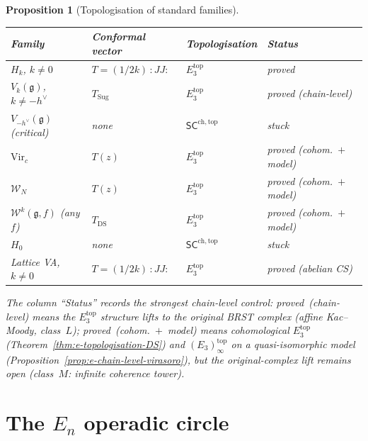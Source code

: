 \documentclass[11pt,reqno]{amsart}
\newtheorem{proposition}[theorem]{Proposition}
\theoremstyle{definition}
\theoremstyle{remark}
\providecommand{\cW}{\mathcal{W}}
\providecommand{\fg}{\mathfrak{g}}
\providecommand{\Ethree}{E_3}
\providecommand{\En}{E_n}
\providecommand{\SCchtop}{\ensuremath{\mathsf{SC}^{\mathrm{ch,top}}}}
\begin{document}
\begin{proposition}[Topologisation of standard families]
\label{prop:e-topologisation-status}
\begin{center}
\renewcommand{\arraystretch}{1.15}
\begin{tabular}{llll}
\textbf{Family} & \textbf{Conformal vector} &
 \textbf{Topologisation} & \textbf{Status} \\
\hline
$H_k$, $k \neq 0$ & $T = (1/2k)\,{:}JJ{:}$ &
 $\Ethree^{\mathrm{top}}$ & proved \\
$V_k(\fg)$, $k \neq -h^\vee$ &
 $T_{\mathrm{Sug}}$ & $\Ethree^{\mathrm{top}}$ &
 proved (chain-level) \\
$V_{-h^\vee}(\fg)$ (critical) & none &
 $\SCchtop$ & stuck \\
$\mathrm{Vir}_c$ & $T(z)$ &
 $\Ethree^{\mathrm{top}}$ &
 proved (cohom.\ $+$ model) \\
$\cW_N$ & $T(z)$ &
 $\Ethree^{\mathrm{top}}$ &
 proved (cohom.\ $+$ model) \\
$\cW^k(\fg, f)$ (any $f$) & $T_{\mathrm{DS}}$ &
 $\Ethree^{\mathrm{top}}$ &
 proved (cohom.\ $+$ model) \\
$H_0$ & none & $\SCchtop$ & stuck \\
Lattice VA, $k \neq 0$ & $T = (1/2k)\,{:}JJ{:}$ &
 $\Ethree^{\mathrm{top}}$ & proved (abelian CS)
\end{tabular}
\end{center}
The column ``Status'' records the strongest chain-level
control:
\emph{proved~\textup{(}chain-level\textup{)}} means the
$\Ethree^{\mathrm{top}}$ structure lifts to the original
BRST complex
\textup{(}affine Kac--Moody, class~$L$\textup{)};
\emph{proved~\textup{(}cohom.~$+$~model\textup{)}} means
cohomological $\Ethree^{\mathrm{top}}$
\textup{(}Theorem~\ref{thm:e-topologisation-DS}\textup{)}
and $(\Ethree)_\infty^{\mathrm{top}}$ on a
quasi-isomorphic model
\textup{(}Proposition~\ref{prop:e-chain-level-virasoro}\textup{)},
but the original-complex lift remains open
\textup{(}class~$M$: infinite coherence tower\textup{)}.
\end{proposition}


\section{The $\En$ operadic circle}
\label{sec:en-circle}
\end{document}
